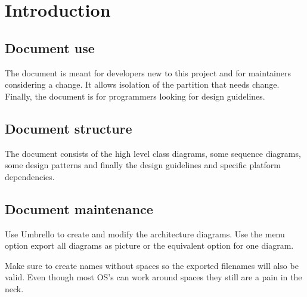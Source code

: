 \chapter{Introduction}

\section{Document use} The document is meant for
developers new to this project and for maintainers
considering a change. It allows isolation of the 
partition that needs change. Finally, the document
is for programmers looking for design guidelines.

\section{Document structure} The document consists
of the high level class diagrams, some sequence diagrams,
some design patterns and finally the design guidelines and 
specific platform dependencies.

\section{Document maintenance} Use Umbrello to create and modify the
architecture diagrams. Use the menu option export all diagrams as
picture or the equivalent option for one diagram.

Make sure to create names without spaces so the exported filenames
will also be valid. Even though most OS's can work around spaces they
still are a pain in the neck.


